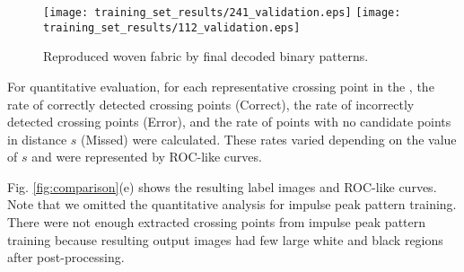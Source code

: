 \begin{figure*}[ht]
{\begin{minipage}[t]{0.22\linewidth}
\texttt{[image: training\_set\_results/241\_validation.eps]}\vspace{4pt}
\texttt{[image: training\_set\_results/112\_validation.eps]}\vspace{4pt}
\end{minipage}}
\centering
\caption{Reproduced woven fabric by final decoded binary patterns.}
\label{fig:result02}
\end{figure*}

For quantitative evaluation, for each representative crossing point in the , the rate of correctly detected crossing points (Correct), the rate of incorrectly detected crossing points (Error), and the rate of points with no candidate points in distance $s$ (Missed) were calculated. These rates varied depending on the value of $s$ and were represented by ROC-like curves.

Fig. \ref{fig:comparison}(e) shows the resulting label images and ROC-like curves. Note that we omitted the quantitative analysis for impulse peak pattern training. There were not enough extracted crossing points from impulse peak pattern training because resulting output images had few large white and black regions after post-processing.


